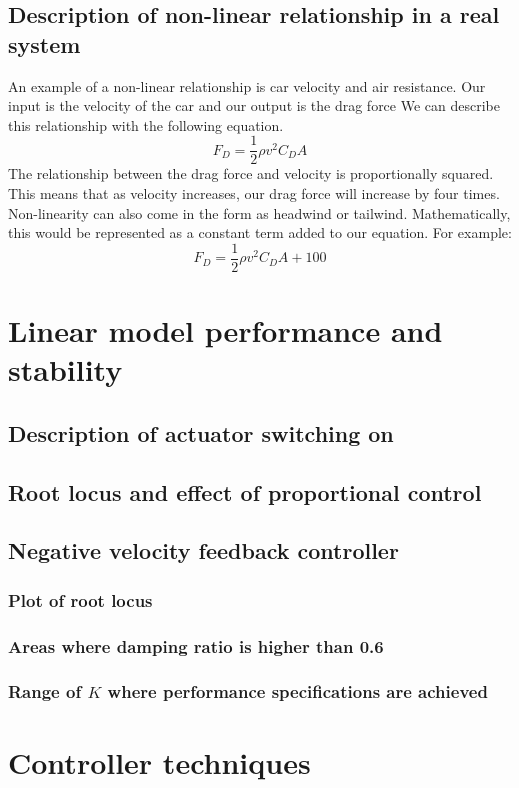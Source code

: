 \documentclass[11pt]{article}
\numberwithin{equation}{section}
\begin{document}
\subsection{Description of non-linear relationship in a real system}
An example of a non-linear relationship is car velocity and air resistance. Our input is the velocity of the car and our output is the drag force We can describe this relationship with the following equation.
\begin{equation}
    F_D = \frac{1}{2} \rho v^2 C_D A
\end{equation}
The relationship between the drag force and velocity is proportionally squared. This means that as velocity increases, our drag force will increase by four times. Non-linearity can also come in the form as headwind or tailwind. Mathematically, this would be represented as a constant term added to our equation. For example:
\begin{equation}
    F_D = \frac{1}{2} \rho v^2 C_D A + 100
\end{equation}
\section{Linear model performance and stability}
\subsection{Description of actuator switching on}
\subsection{Root locus and effect of proportional control}
\subsection{Negative velocity feedback controller}
\subsubsection{Plot of root locus}
\subsubsection{Areas where damping ratio is higher than 0.6}
\subsubsection{Range of $K$ where performance specifications are achieved}
\section{Controller techniques}
\end{document}
